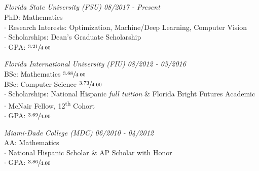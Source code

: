 \documentclass[UTF8, line, margin]{res}
\begin{document}
\address{
\faPhone \space (786) 205-0050
\space $\mid$ \faGithub \space \href{https://github.com/daniel-simon-gonzalez}{@daniel-simon-gonzalez}
\space $\mid$ \space \faLinkedin \space \href{https://www.linkedin.com/in/daniel-simon-gonzalez}{@daniel-simon-gonzalez}
\space $\mid$ \space \faEnvelope \space \href{mailto:dgonzale@math.fsu.edu}{dgonzale@math.fsu.edu}
}

\begin{resume}
\section{}
\textit{Florida State University (FSU) \hfill 08/2017 - Present}\\
PhD: Mathematics\\
$\cdot$ Research Interests: Optimization, Machine/Deep Learning, Computer Vision\\
$\cdot$ Scholarships: Dean's Graduate Scholarship\\
$\cdot$ GPA: $\sfrac{3.21}{4.00}$


\textit{Florida International University (FIU) \hfill 08/2012 - 05/2016}\\
BSc: Mathematics $\sfrac{3.68}{4.00}$\\%
BSc: Computer Science $\sfrac{3.73}{4.00}$\\%
$\cdot$ Scholarships: National Hispanic \textit{full tuition} \& Florida Bright Futures Academic\\
$\cdot$ McNair Fellow, 12\textsuperscript{th} Cohort\\
$\cdot$ GPA: $\sfrac{3.69}{4.00}$

\textit{Miami-Dade College (MDC) \hfill 06/2010 - 04/2012}\\
AA: Mathematics\\%
$\cdot$ National Hispanic Scholar \& AP Scholar with Honor\\
$\cdot$ GPA: $\sfrac{3.86}{4.00}$


\end{resume}
\end{document}
